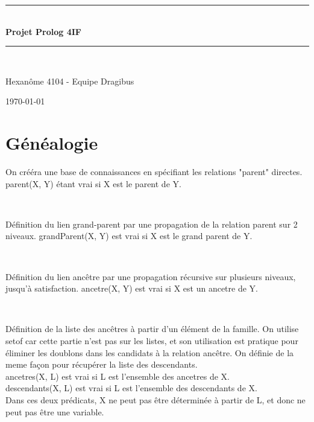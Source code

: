 \documentclass[a4paper, 11pt]{article}
\newcommand{\HRule}{\rule{\linewidth}{0.5mm}}
\newenvironment{DDbox}[1]{
\begin{lrbox}{\BBbox}\begin{minipage}{\linewidth}}
{\end{minipage}\end{lrbox}\noindent\colorbox{Zgris}{\usebox{\BBbox}} \\
[.5cm]}
\begin{document}
\begin{titlepage}
    \begin{center}
        \HRule \\[0.4cm]
        {\huge \bfseries Projet Prolog 4IF}
        \HRule \\[1.5cm]

        \begin{minipage}{0.8\textwidth}
            \center
            \large
            Hexanôme 4104 - Equipe Dragibus
        \end{minipage}

        \vfill
        {\large \today}
    \end{center}
\end{titlepage}


\section{Généalogie}
On crééra une base de connaissances en spécifiant les relations "parent"
directes. parent(X, Y) étant vrai si X est le parent de Y. \\
\begin{DDbox}{\linewidth}
    
\end{DDbox}

Définition du lien grand-parent par une propagation de la relation parent sur 2
niveaux. grandParent(X, Y) est vrai si X est le grand parent de Y. \\
\begin{DDbox}{\linewidth}
    
\end{DDbox}

Définition du lien ancêtre par une propagation récursive sur plusieurs
niveaux, jusqu'à satisfaction. ancetre(X, Y) est vrai si X est un ancetre de Y. \\
\begin{DDbox}{\linewidth}
    
\end{DDbox}

Définition de la liste des ancêtres à partir d'un élément de la
famille.  On utilise setof car cette partie n'est pas sur les
listes, et son utilisation est pratique pour éliminer les
doublons dans les candidats à la relation ancêtre. On définie de
la meme façon pour récupérer la liste des descendants. \\
ancetres(X, L) est vrai si L est l'ensemble des ancetres de X. \\
descendants(X, L) est vrai si L est l'ensemble des descendants de X. \\
Dans ces deux prédicats, X ne peut pas être déterminée à partir
de L, et donc ne peut pas être une variable. \\
\begin{DDbox}{\linewidth}
    
\end{DDbox}
\end{document}

